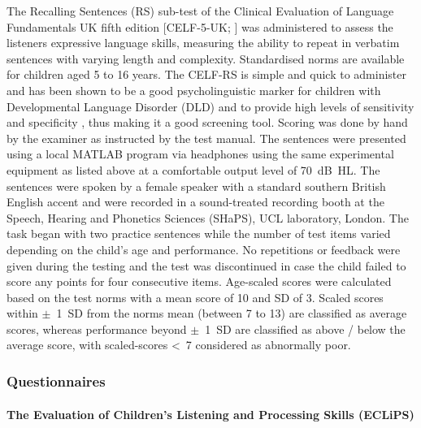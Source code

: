 \documentclass[a4paper, twoside]{templates/ociamthesis}
\begin{document}
\hfill\break
The Recalling Sentences (RS) sub-test of the Clinical Evaluation of Language Fundamentals UK fifth edition {[}CELF-5-UK; \textcite{HWiig2017}{]} was administered to assess the listeners expressive language skills, measuring the ability to repeat in verbatim sentences with varying length and complexity. Standardised norms are available for children aged 5 to 16 years. The CELF-RS is simple and quick to administer and has been shown to be a good psycholinguistic marker for children with Developmental Language Disorder (DLD) and to provide high levels of sensitivity and specificity \autocite{Conti-Ramsden2001}, thus making it a good screening tool. Scoring was done by hand by the examiner as instructed by the test manual. The sentences were presented using a local MATLAB program via headphones using the same experimental equipment as listed above at a comfortable output level of 70~dB~HL. The sentences were spoken by a female speaker with a standard southern British English accent and were recorded in a sound-treated recording booth at the Speech, Hearing and Phonetics Sciences (SHaPS), UCL laboratory, London. The task began with two practice sentences while the number of test items varied depending on the child's age and performance. No repetitions or feedback were given during the testing and the test was discontinued in case the child failed to score any points for four consecutive items. Age-scaled scores were calculated based on the test norms with a mean score of 10 and SD of 3. Scaled scores within \(\pm\)~1~SD from the norms mean (between 7 to 13) are classified as average scores, whereas performance beyond \(\pm\)~1~SD are classified as above / below the average score, with scaled-scores \textless~7 considered as abnormally poor.\\

\hypertarget{questionnaires}{%
\subsubsection{Questionnaires}\label{questionnaires}}

\hypertarget{the-evaluation-of-childrens-listening-and-processing-skills-eclips}{%
\paragraph{The Evaluation of Children's Listening and Processing Skills (ECLiPS)}\label{the-evaluation-of-childrens-listening-and-processing-skills-eclips}}
\end{document}
